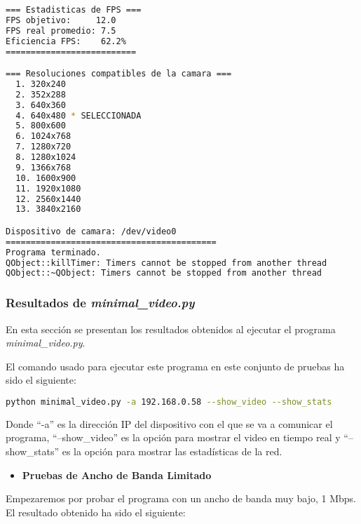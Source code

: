 \begin{adjustbox}{max width=\textwidth}
\begin{lstlisting}[language=bash,basicstyle=\ttfamily\scriptsize]
=== Estadisticas de FPS ===
FPS objetivo:     12.0
FPS real promedio: 7.5
Eficiencia FPS:    62.2%
==========================

=== Resoluciones compatibles de la camara ===
  1. 320x240
  2. 352x288
  3. 640x360
  4. 640x480 * SELECCIONADA
  5. 800x600
  6. 1024x768
  7. 1280x720
  8. 1280x1024
  9. 1366x768
  10. 1600x900
  11. 1920x1080
  12. 2560x1440
  13. 3840x2160

Dispositivo de camara: /dev/video0
==========================================
Programa terminado.
QObject::killTimer: Timers cannot be stopped from another thread
QObject::~QObject: Timers cannot be stopped from another thread
\end{lstlisting}
\end{adjustbox}

\newpage

\subsubsection{Resultados de \textit{minimal\_video.py}}

En esta sección se presentan los resultados obtenidos al ejecutar el programa \textit{minimal\_video.py}.

\vspace{\baselineskip}
El comando usado para ejecutar este programa en este conjunto de pruebas ha sido el siguiente:
\begin{lstlisting}[language=bash]
python minimal_video.py -a 192.168.0.58 --show_video --show_stats
\end{lstlisting}
Donde ``-a'' es la dirección IP del dispositivo con el que se va a comunicar el programa, ``--show\_video'' es la opción para mostrar el video en tiempo real y ``--show\_stats'' es la opción para mostrar las estadísticas de la red.

\vspace{\baselineskip}
\begin{itemize}
    \item \textbf{Pruebas de Ancho de Banda Limitado}
\end{itemize}

Empezaremos por probar el programa con un ancho de banda muy bajo, 1 Mbps. El resultado obtenido ha sido el siguiente:

